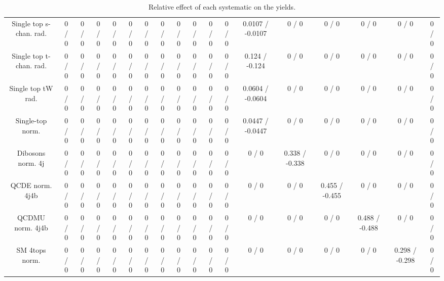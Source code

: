 \documentclass[10pt]{article}
\begin{document}
\begin{table}[htbp]
\begin{center}
\begin{tabular}{|c|c|c|c|c|c|c|c|c|c|c|c|c|c|c|c|c|c|}
  Single top s-chan. rad. & 0 / 0 & 0 / 0 & 0 / 0 & 0 / 0 & 0 / 0 & 0 / 0 & 0 / 0 & 0 / 0 & 0 / 0 & 0 / 0 & 0 / 0 & 0.0107 / -0.0107 & 0 / 0 & 0 / 0 & 0 / 0 & 0 / 0 & 0 / 0 \\ 
  Single top t-chan. rad. & 0 / 0 & 0 / 0 & 0 / 0 & 0 / 0 & 0 / 0 & 0 / 0 & 0 / 0 & 0 / 0 & 0 / 0 & 0 / 0 & 0 / 0 & 0.124 / -0.124 & 0 / 0 & 0 / 0 & 0 / 0 & 0 / 0 & 0 / 0 \\ 
  Single top tW rad. & 0 / 0 & 0 / 0 & 0 / 0 & 0 / 0 & 0 / 0 & 0 / 0 & 0 / 0 & 0 / 0 & 0 / 0 & 0 / 0 & 0 / 0 & 0.0604 / -0.0604 & 0 / 0 & 0 / 0 & 0 / 0 & 0 / 0 & 0 / 0 \\ 
  Single-top norm. & 0 / 0 & 0 / 0 & 0 / 0 & 0 / 0 & 0 / 0 & 0 / 0 & 0 / 0 & 0 / 0 & 0 / 0 & 0 / 0 & 0 / 0 & 0.0447 / -0.0447 & 0 / 0 & 0 / 0 & 0 / 0 & 0 / 0 & 0 / 0 \\ 
  Dibosons norm. 4j & 0 / 0 & 0 / 0 & 0 / 0 & 0 / 0 & 0 / 0 & 0 / 0 & 0 / 0 & 0 / 0 & 0 / 0 & 0 / 0 & 0 / 0 & 0 / 0 & 0.338 / -0.338 & 0 / 0 & 0 / 0 & 0 / 0 & 0 / 0 \\ 
  QCDE norm. 4j4b & 0 / 0 & 0 / 0 & 0 / 0 & 0 / 0 & 0 / 0 & 0 / 0 & 0 / 0 & 0 / 0 & 0 / 0 & 0 / 0 & 0 / 0 & 0 / 0 & 0 / 0 & 0.455 / -0.455 & 0 / 0 & 0 / 0 & 0 / 0 \\ 
  QCDMU norm. 4j4b & 0 / 0 & 0 / 0 & 0 / 0 & 0 / 0 & 0 / 0 & 0 / 0 & 0 / 0 & 0 / 0 & 0 / 0 & 0 / 0 & 0 / 0 & 0 / 0 & 0 / 0 & 0 / 0 & 0.488 / -0.488 & 0 / 0 & 0 / 0 \\ 
  SM 4tops norm. & 0 / 0 & 0 / 0 & 0 / 0 & 0 / 0 & 0 / 0 & 0 / 0 & 0 / 0 & 0 / 0 & 0 / 0 & 0 / 0 & 0 / 0 & 0 / 0 & 0 / 0 & 0 / 0 & 0 / 0 & 0.298 / -0.298 & 0 / 0 \\ 
\hline 
\end{tabular} 
\caption{Relative effect of each systematic on the yields.} 
\end{center} 
\end{table} 
\end{document}
